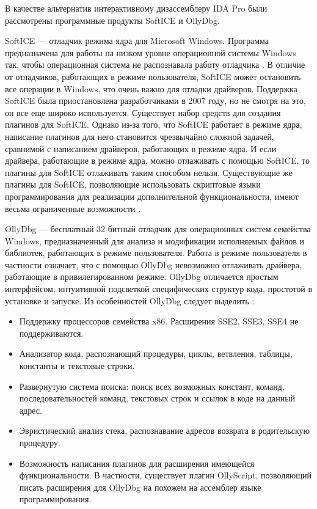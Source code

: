 В качестве альтернатив интерактивному дизассемблеру IDA Pro были рассмотрены программные продукты SoftICE и OllyDbg.

SoftICE --- отладчик режима ядра для Microsoft Windows. Программа предназначена для работы на низком уровне операционной системы Windows так, чтобы операционная система не распознавала работу отладчика \cite{boldewin06}. В отличие от отладчиков, работающих в режиме пользователя, SoftICE может остановить все операции в Windows, что очень важно для отладки драйверов. Поддержка SoftICE была приостановлена разработчиками в 2007 году, но не смотря на это, он все еще широко используется. Существует набор средств для создания плагинов для SoftICE. Однако из-за того, что SoftICE работает в режиме ядра, написание плагинов для него становится чрезвычайно сложной задачей, сравнимой с написанием драйверов, работающих в режиме ядра. И если драйвера, работающие в режиме ядра, можно отлаживать с помощью SoftICE, то плагины для SoftICE отлаживать таким способом нельзя. Существующие же плагины для SoftICE, позволяющие использовать скриптовые языки программирования для реализации дополнительной функциональности, имеют весьма ограниченные возможности \cite{softicescripting}.

OllyDbg --- бесплатный 32-битный отладчик для операционных систем семейства Windows, предназначенный для анализа и модификации исполняемых файлов и библиотек, работающих в режиме пользователя. Работа в режиме пользователя в частности означает, что с помощью OllyDbg невозможно отлаживать драйвера, работающие в привилегированном режиме. OllyDbg отличается простым интерфейсом, интуитивной подсветкой специфических структур кода, простотой в установке и запуске. Из особенностей OllyDbg следует выделить \cite{ollydbg}:

\begin{itemize}
\item Поддержку процессоров семейства x86. Расширения SSE2, SSE3, SSE4 не поддерживаются.
\item Анализатор кода, распознающий процедуры, циклы, ветвления, таблицы, константы и текстовые строки.
\item Развернутую система поиска: поиск всех возможных констант, команд, последовательностей команд, текстовых строк и ссылок в коде на данный адрес.
\item Эвристический анализ стека, распознавание адресов возврата в родительскую процедуру.
\item Возможность написания плагинов для расширения имеющейся функциональности. В частности, существует плагин OllyScript, позволяющий писать расширения для OllyDbg на похожем на ассемблер языке программирования.
\end{itemize}

